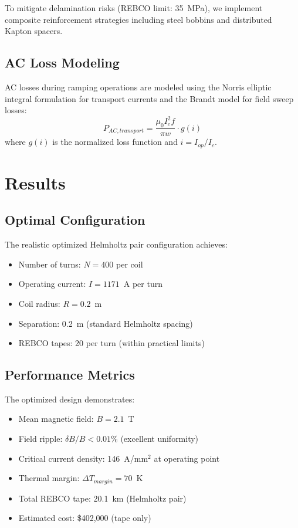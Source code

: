 \documentclass[journal]{IEEEtran}
\begin{document}
To mitigate delamination risks (REBCO limit: 35~MPa), we implement composite reinforcement strategies including steel bobbins and distributed Kapton spacers.

\subsection{AC Loss Modeling}
AC losses during ramping operations are modeled using the Norris elliptic integral formulation for transport currents and the Brandt model for field sweep losses:
\begin{equation}
P_{AC,transport} = \frac{\mu_0 I_c^2 f}{\pi w} \cdot g(i)
\end{equation}
where $g(i)$ is the normalized loss function and $i = I_{op}/I_c$.

\section{Results}

\subsection{Optimal Configuration}
The realistic optimized Helmholtz pair configuration achieves:
\begin{itemize}
\item Number of turns: $N = 400$ per coil
\item Operating current: $I = 1171$~A per turn
\item Coil radius: $R = 0.2$~m
\item Separation: 0.2~m (standard Helmholtz spacing)
\item REBCO tapes: 20 per turn (within practical limits)
\end{itemize}

\subsection{Performance Metrics}
The optimized design demonstrates:
\begin{itemize}
\item Mean magnetic field: $B = 2.1$~T
\item Field ripple: $\delta B / B < 0.01\%$ (excellent uniformity)
\item Critical current density: 146~A/mm$^2$ at operating point
\item Thermal margin: $\Delta T_{margin} = 70$~K
\item Total REBCO tape: 20.1~km (Helmholtz pair)
\item Estimated cost: \$402,000 (tape only)
\end{itemize}
\end{document}
